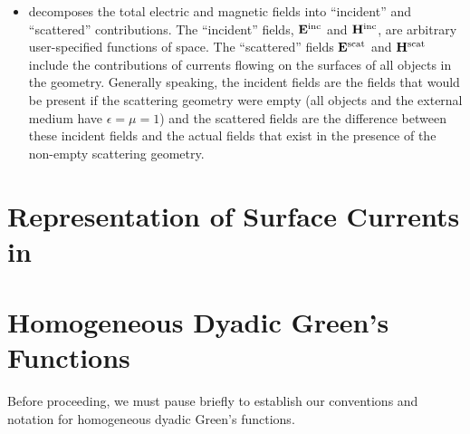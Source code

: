 \documentclass[dvips,letterpaper]{article}
\begin{document}
\begin{itemize}
\item
\lss decomposes the total electric and magnetic fields into 
``incident'' and ``scattered'' contributions. The ``incident'' 
fields, $\mathbf{E}^{\hbox{\scriptsize{inc}}}$ and $\mathbf{H}^{\hbox{\scriptsize{inc}}}$, 
are arbitrary user-specified functions of space.
The ``scattered'' fields $\mathbf{E}^{\hbox{\scriptsize{scat}}}$ and 
$\mathbf{H}^{\hbox{\scriptsize{scat}}}$ include the contributions of currents
flowing on the surfaces of all objects in the \lss geometry.
Generally speaking, the incident fields are the fields that
would be present if the scattering geometry were 
empty (all objects and the external medium have
$\epsilon=\mu=1$) and the scattered fields are the difference
between these incident fields and the actual fields that
exist in the presence of the non-empty scattering geometry. 

\end{itemize}

\newpage
\section{Representation of Surface Currents in \ls}

\newpage
\section{Homogeneous Dyadic Green's Functions}

Before proceeding, we must pause briefly to establish our 
conventions and notation for homogeneous dyadic Green's
functions.
\end{document}
